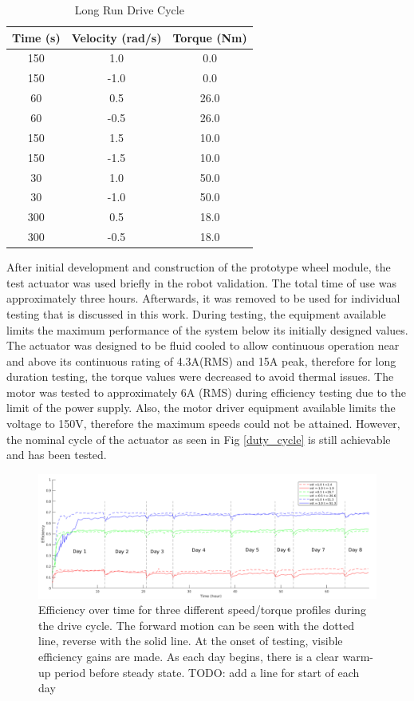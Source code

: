 \documentclass[letterpaper, 10 pt, conference]{ieeeconf}  %
\begin{document}
\begin{table}[h]
\caption{Long Run Drive Cycle}
\label{table_2}
\begin{center}
\begin{tabular}{|c||c||c|}
\hline
Time (s) & Velocity (rad/s) & Torque (Nm)\\
\hline
150 & 1.0 & 0.0\\
\hline
150 & -1.0 & 0.0\\
\hline
60 & 0.5 & 26.0\\
\hline
60 & -0.5 & 26.0\\
\hline
150 & 1.5 & 10.0\\
\hline
150 & -1.5 & 10.0\\
\hline
30 & 1.0 & 50.0\\
\hline
30 & -1.0 & 50.0\\
\hline
300 & 0.5 & 18.0\\
\hline
300 & -0.5 & 18.0\\
\hline
\end{tabular}
\end{center}
\end{table}

After initial development and construction of the prototype wheel module, the test actuator was used briefly in the robot validation. The total time of use was approximately three hours. Afterwards, it was removed to be used for individual testing that is discussed in this work. During testing, the equipment available limits the maximum performance of the system below its initially designed values. The actuator was designed to be fluid cooled to allow continuous operation near and above its continuous rating of 4.3A(RMS) and 15A peak, therefore for long duration testing, the torque values were decreased to avoid thermal issues. The motor was tested to approximately 6A (RMS) during efficiency testing due to the limit of the power supply. Also, the motor driver equipment available limits the voltage to 150V, therefore the maximum speeds could not be attained. However, the nominal cycle of the actuator as seen in Fig \ref{duty_cycle} is still achievable and has been tested. 
      
   \begin{figure}[t]
      \centering
      \includegraphics[width=\linewidth]{long_run_plot_v3}
      \caption{Efficiency over time for three different speed/torque profiles during the drive cycle. The forward motion can be seen with the dotted line, reverse with the solid line. At the onset of testing, visible efficiency gains are made. As each day begins, there is a clear warm-up period before steady state. TODO: add a line for start of each day}
      \label{long_run}
   \end{figure}
   
\end{document}
